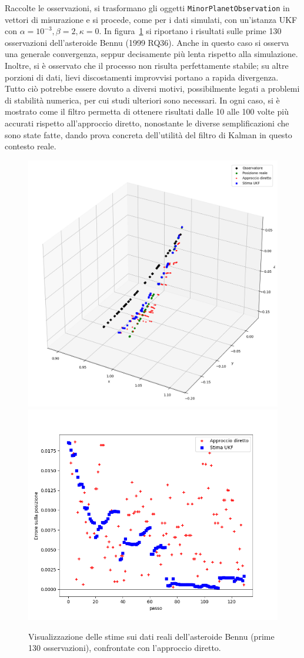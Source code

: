 \documentclass[12pt,a4paper,openright,twoside]{book}
\begin{document}
Raccolte le osservazioni, si trasformano gli oggetti \lstinline{MinorPlanetObservation} in vettori di misurazione e si procede, come per i dati simulati, con un'istanza UKF con $\alpha=10^{-3},\beta=2,\kappa=0$. In figura~\ref{fig:Bennu130} si riportano i risultati sulle prime 130 osservazioni dell'asteroide Bennu (1999 RQ36). Anche in questo caso si osserva una generale convergenza, seppur decisamente più lenta rispetto alla simulazione. Inoltre, si è osservato che il processo non risulta perfettamente stabile; su altre porzioni di dati, lievi discostamenti improvvisi portano a rapida divergenza. Tutto ciò potrebbe essere dovuto a diversi motivi, possibilmente legati a problemi di stabilità numerica, per cui studi ulteriori sono necessari. In ogni caso, si è mostrato come il filtro permetta di ottenere risultati dalle 10 alle 100 volte più accurati rispetto all'approccio diretto, nonostante le diverse semplificazioni che sono state fatte, dando prova concreta dell'utilità del filtro di Kalman in questo contesto reale.

\begin{figure}
    \includegraphics[width=0.55\linewidth]{figures/Bennu_130_3d.png}
    \includegraphics[width=0.45\linewidth]{figures/Bennu_130_error.png}
    \caption{Visualizzazione delle stime sui dati reali dell'asteroide Bennu (prime 130 osservazioni), confrontate con l'approccio diretto.}
    \label{fig:Bennu130}
    \vspace{2\baselineskip}
\end{figure}
\end{document}
